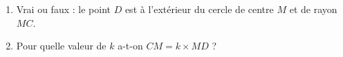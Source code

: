 
\begin{exercice}\label{exo2smath-0263}

\begin{center}
   
\end{center}
\begin{enumerate}
    \item
        Vrai ou faux : le point \( D\) est à l'extérieur du cercle de centre \( M\) et de rayon \( MC\).
    \item
    Pour quelle valeur de \( k\) a-t-on \( CM=k\times MD\) ?
\end{enumerate}

\end{exercice}
